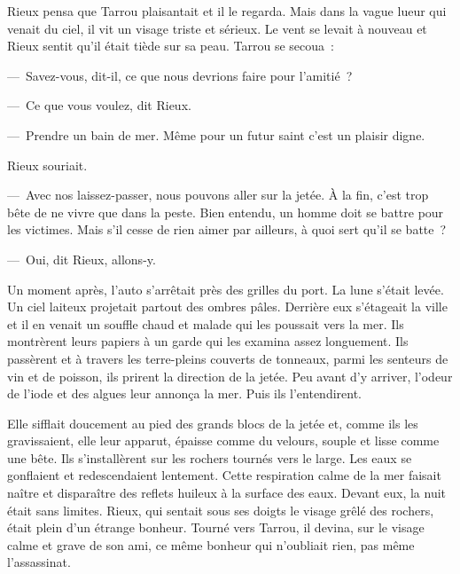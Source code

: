 \documentclass[french,twoside]{book} %
\begin{document}
Rieux pensa que Tarrou plaisantait et il le regarda. Mais dans la vague lueur qui venait du ciel, il vit un visage triste et sérieux. Le vent se levait à nouveau et Rieux sentit qu’il était tiède sur sa peau. Tarrou se secoua :\par
— Savez-vous, dit-il, ce que nous devrions faire pour l’amitié ?\par
— Ce que vous voulez, dit Rieux.\par
— Prendre un bain de mer. Même pour un futur saint c’est un plaisir digne.\par
Rieux souriait.\par
— Avec nos laissez-passer, nous pouvons aller sur la jetée. À la fin, c’est trop bête de ne vivre que dans la peste. Bien entendu, un homme doit se battre pour les victimes. Mais s’il cesse de rien aimer par ailleurs, à quoi sert qu’il se batte ?\par
— Oui, dit Rieux, allons-y.\par
Un moment après, l’auto s’arrêtait près des grilles du port. La lune s’était levée. Un ciel laiteux projetait partout des ombres pâles. Derrière eux s’étageait la ville et il en venait un souffle chaud et malade qui les poussait vers la mer. Ils montrèrent leurs papiers à un garde qui les examina assez longuement. Ils passèrent et à travers les terre-pleins couverts de tonneaux, parmi les senteurs de vin et de poisson, ils prirent la direction de la jetée. Peu avant d’y arriver, l’odeur de l’iode et des algues leur annonça la mer. Puis ils l’entendirent.\par
Elle sifflait doucement au pied des grands blocs de la jetée et, comme ils les gravissaient, elle leur apparut, épaisse comme du velours, souple et lisse comme une bête. Ils s’installèrent sur les rochers tournés vers le large. Les eaux se gonflaient et redescendaient lentement. Cette respiration calme de la mer faisait naître et disparaître des reflets huileux à la surface des eaux. Devant eux, la nuit était sans limites. Rieux, qui sentait sous ses doigts le visage grêlé des rochers, était plein d’un étrange bonheur. Tourné vers Tarrou, il devina, sur le visage calme et grave de son ami, ce même bonheur qui n’oubliait rien, pas même l’assassinat.\par
\end{document}
